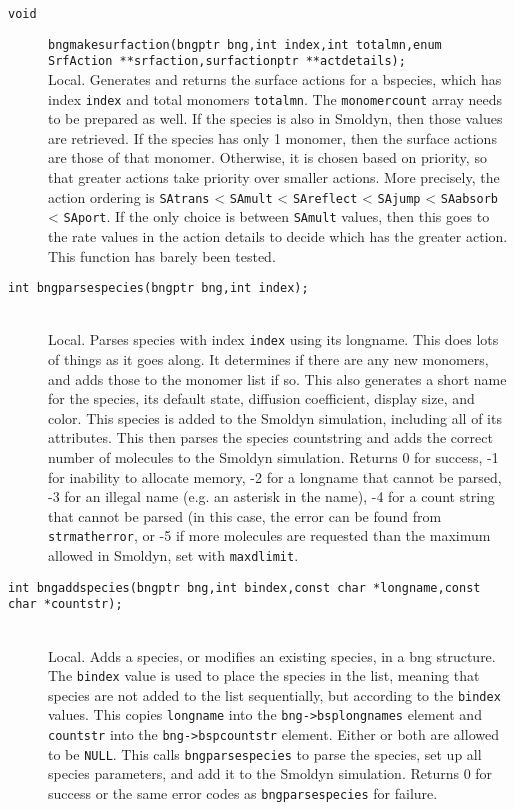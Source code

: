 \documentclass {scrbook}
\newcommand {\ttt} {\texttt}
\begin{document}
\begin{description}
\item[\ttt{void}]
\ttt{bngmakesurfaction(bngptr bng,int index,int totalmn,enum SrfAction **srfaction,surfactionptr **actdetails);}
\hfill \\
Local. Generates and returns the surface actions for a bspecies, which has index \ttt{index} and total monomers \ttt{totalmn}. The \ttt{monomercount} array needs to be prepared as well. If the species is also in Smoldyn, then those values are retrieved. If the species has only 1 monomer, then the surface actions are those of that monomer. Otherwise, it is chosen based on priority, so that greater actions take priority over smaller actions. More precisely, the action ordering is \ttt{SAtrans} < \ttt{SAmult} < \ttt{SAreflect} < \ttt{SAjump} < \ttt{SAabsorb} < \ttt{SAport}. If the only choice is between \ttt{SAmult} values, then this goes to the rate values in the action details to decide which has the greater action. This function has barely been tested.

\item[\ttt{int bngparsespecies(bngptr bng,int index);}]
\hfill \\
Local. Parses species with index \ttt{index} using its longname. This does lots of things as it goes along. It determines if there are any new monomers, and adds those to the monomer list if so. This also generates a short name for the species, its default state, diffusion coefficient, display size, and color. This species is added to the Smoldyn simulation, including all of its attributes. This then parses the species countstring and adds the correct number of molecules to the Smoldyn simulation. Returns 0 for success, -1 for inability to allocate memory, -2 for a longname that cannot be parsed, -3 for an illegal name (e.g. an asterisk in the name), -4 for a count string that cannot be parsed (in this case, the error can be found from \ttt{strmatherror}, or -5 if more molecules are requested than the maximum allowed in Smoldyn, set with \ttt{maxdlimit}.

\item[\ttt{int bngaddspecies(bngptr bng,int bindex,const char *longname,const char *countstr);}]
\hfill \\
Local. Adds a species, or modifies an existing species, in a bng structure. The \ttt{bindex} value is used to place the species in the list, meaning that species are not added to the list sequentially, but according to the \ttt{bindex} values. This copies \ttt{longname} into the \ttt{bng->bsplongnames} element and \ttt{countstr} into the \ttt{bng->bspcountstr} element. Either or both are allowed to be \ttt{NULL}. This calls \ttt{bngparsespecies} to parse the species, set up all species parameters, and add it to the Smoldyn simulation. Returns 0 for success or the same error codes as \ttt{bngparsespecies} for failure.


\end{description}
\end{document}
